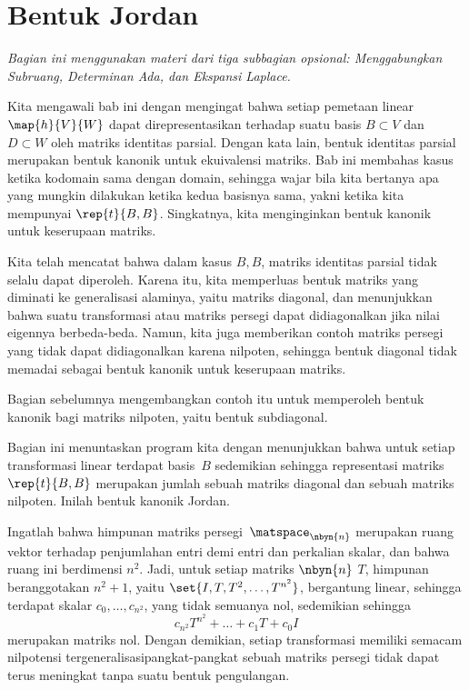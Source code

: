 \section{Bentuk Jordan}
\noindent\textit{Bagian ini menggunakan materi dari tiga subbagian opsional:
Menggabungkan Subruang, Determinan Ada, dan Ekspansi Laplace.}

Kita mengawali bab ini
dengan mengingat bahwa setiap pemetaan linear $\map{h}{V}{W}$ dapat
direpresentasikan terhadap suatu
basis $B\subset V$ dan $D\subset W$ oleh matriks identitas parsial.
Dengan kata lain, bentuk identitas parsial merupakan bentuk kanonik untuk
ekuivalensi matriks.
Bab ini membahas kasus ketika
kodomain sama dengan domain, sehingga
wajar bila kita bertanya apa yang mungkin dilakukan ketika
kedua basisnya sama, yakni ketika kita mempunyai $\rep{t}{B,B}$.
Singkatnya, kita menginginkan bentuk kanonik untuk keserupaan matriks.

Kita telah mencatat bahwa dalam kasus $B,B$,
matriks identitas parsial tidak selalu dapat diperoleh.
Karena itu, kita memperluas bentuk matriks
yang diminati ke generalisasi alaminya,
yaitu matriks diagonal, dan
menunjukkan bahwa suatu transformasi atau matriks persegi dapat didiagonalkan
jika nilai eigennya berbeda-beda.
Namun, kita juga memberikan contoh
matriks persegi yang tidak dapat didiagonalkan
karena nilpoten,
sehingga bentuk diagonal tidak memadai sebagai bentuk kanonik
untuk keserupaan matriks.

Bagian sebelumnya mengembangkan contoh itu
untuk memperoleh bentuk kanonik bagi matriks nilpoten, yaitu bentuk subdiagonal.

Bagian ini menuntaskan program kita dengan
menunjukkan bahwa untuk setiap transformasi linear terdapat
basis~\( B \)
sedemikian sehingga representasi matriks $\rep{t}{B,B}$ merupakan jumlah
sebuah matriks diagonal dan sebuah matriks nilpoten.
Inilah bentuk kanonik Jordan.









Ingatlah bahwa himpunan matriks persegi~\( \matspace_{\nbyn{n}} \)
merupakan ruang vektor terhadap penjumlahan entri demi entri dan perkalian skalar,
dan bahwa
ruang ini berdimensi \( n^2 \).
Jadi, untuk setiap matriks \( \nbyn{n} \) $T$, himpunan beranggotakan
\( n^2+1 \), yaitu \( \set{I,T,T^2,\dots,T^{n^2} } \), bergantung
linear, sehingga terdapat skalar \( c_0,\dots,c_{n^2} \),
yang tidak semuanya nol, sedemikian sehingga
\begin{equation*}
  c_{n^2}T^{n^2}+\dots+c_1T+c_0I
\end{equation*}
merupakan matriks nol.
Dengan demikian, setiap transformasi memiliki semacam
nilpotensi tergeneralisasi\Dash pangkat-pangkat
sebuah matriks persegi tidak dapat terus meningkat tanpa suatu bentuk pengulangan.

